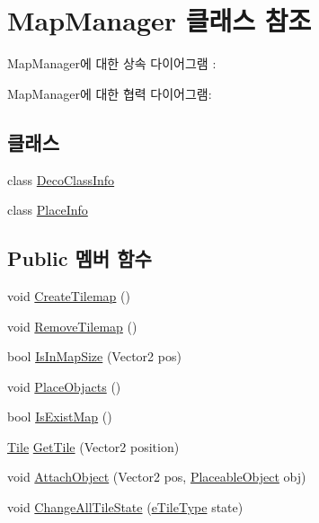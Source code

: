 \hypertarget{class_map_manager}{}\section{Map\+Manager 클래스 참조}
\label{class_map_manager}


Map\+Manager에 대한 상속 다이어그램 \+: 


Map\+Manager에 대한 협력 다이어그램\+:
\subsection*{클래스}
\begin{DoxyCompactItemize}
\item 
class \hyperlink{class_map_manager_1_1_deco_class_info}{Deco\+Class\+Info}
\item 
class \hyperlink{class_map_manager_1_1_place_info}{Place\+Info}
\end{DoxyCompactItemize}
\subsection*{Public 멤버 함수}
\begin{DoxyCompactItemize}
\item 
void \hyperlink{class_map_manager_aa6125f2ca4b3c4e8858f73f5e65d385b}{Create\+Tilemap} ()
\item 
void \hyperlink{class_map_manager_aac20afabde4946e32ce1e719c72e0f50}{Remove\+Tilemap} ()
\item 
bool \hyperlink{class_map_manager_a504d7a68ace64557bc3c3254a8b1cddc}{Is\+In\+Map\+Size} (Vector2 pos)
\item 
void \hyperlink{class_map_manager_a4213ccbaa1a81d0a47884de50a28de32}{Place\+Objacts} ()
\item 
bool \hyperlink{class_map_manager_a9a18efae73b0d690d2bc6c8ac8703a02}{Is\+Exist\+Map} ()
\item 
\hyperlink{class_tile}{Tile} \hyperlink{class_map_manager_ae457099efdd1a804add3b851b2bc7691}{Get\+Tile} (Vector2 position)
\item 
void \hyperlink{class_map_manager_ab8cbf46e369a9c59ff183a1b6c3b20bb}{Attach\+Object} (Vector2 pos, \hyperlink{class_placeable_object}{Placeable\+Object} obj)
\item 
void \hyperlink{class_map_manager_a68f796431393b7239320ab1f5200213a}{Change\+All\+Tile\+State} (\hyperlink{_tile_8cs_a271bc07be325bca511bcb747e0ff2fda}{e\+Tile\+Type} state)
\end{DoxyCompactItemize}
